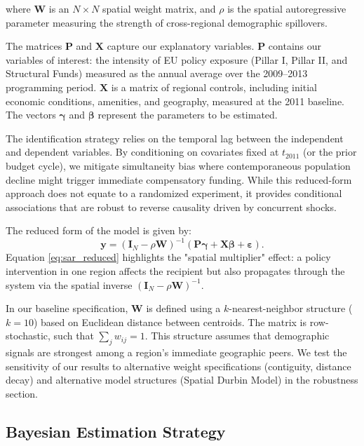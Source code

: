 \documentclass[
	a4paper, %
	10pt, %
]{LTJournalArticle}
\begin{document}
where $\mathbf{W}$ is an $N \times N$ spatial weight matrix, and $\rho$ is the spatial autoregressive parameter measuring the strength of cross-regional demographic spillovers.

The matrices $\mathbf{P}$ and $\mathbf{X}$ capture our explanatory variables. $\mathbf{P}$ contains our variables of interest: the intensity of EU policy exposure (Pillar I, Pillar II, and Structural Funds) measured as the annual average over the 2009--2013 programming period. $\mathbf{X}$ is a matrix of regional controls, including initial economic conditions, amenities, and geography, measured at the 2011 baseline. The vectors $\boldsymbol{\gamma}$ and $\boldsymbol{\beta}$ represent the parameters to be estimated.

The identification strategy relies on the temporal lag between the independent and dependent variables. By conditioning on covariates fixed at $t_{2011}$ (or the prior budget cycle), we mitigate simultaneity bias where contemporaneous population decline might trigger immediate compensatory funding. While this reduced-form approach does not equate to a randomized experiment, it provides conditional associations that are robust to reverse causality driven by concurrent shocks.

The reduced form of the model is given by:
\begin{equation}
\label{eq:sar_reduced}
\mathbf{y} = (\mathbf{I}_N - \rho \mathbf{W})^{-1} (\mathbf{P} \boldsymbol{\gamma} + \mathbf{X} \boldsymbol{\beta} + \boldsymbol{\varepsilon}).
\end{equation}
Equation \eqref{eq:sar_reduced} highlights the "spatial multiplier" effect: a policy intervention in one region affects the recipient but also propagates through the system via the spatial inverse $(\mathbf{I}_N - \rho \mathbf{W})^{-1}$.

In our baseline specification, $\mathbf{W}$ is defined using a $k$-nearest-neighbor structure ($k=10$) based on Euclidean distance between centroids. The matrix is row-stochastic, such that $\sum_{j} w_{ij} = 1$. This structure assumes that demographic signals are strongest among a region's immediate geographic peers. We test the sensitivity of our results to alternative weight specifications (contiguity, distance decay) and alternative model structures (Spatial Durbin Model) in the robustness section.

\subsection{Bayesian Estimation Strategy}
\end{document}
